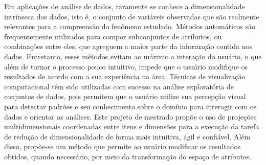 \begin{resumo}
  Em aplicações de análise de dados, raramente se conhece a dimensionalidade intrínseca dos dados, isto é, o conjunto de variáveis observadas que são realmente relevantes para a compreensão do fenômeno estudado.
  Métodos automáticos são frequentemente utilizados para compor subconjuntos de atributos, ou combinações entre eles, que agreguem a maior parte da informação contida nos dados. 
  Entretanto, esses métodos evitam ao máximo a interação do usuário, o que além de tornar o processo pouco intuitivo, impede que o usuário modifique os resultados de acordo com a sua experiência na área. 
  Técnicas de visualização computacional têm sido utilizadas com sucesso na análise exploratória de conjuntos de dados, pois permitem que o usuário utilize sua percepção visual para detectar padrões e seu conhecimento sobre o domínio para interagir com os dados e orientar as análises. 
  Este projeto de mestrado propõe o uso de projeções multidimensionais coordenadas entre itens e dimensões para a execução da tarefa de redução de dimensionalidade de forma mais intuitiva, ágil e confiável. Além disso, propõe-se um método que permite ao usuário modificar os resultados obtidos, quando necessário, por meio da transformação do espaço de atributos.
\end{resumo}
